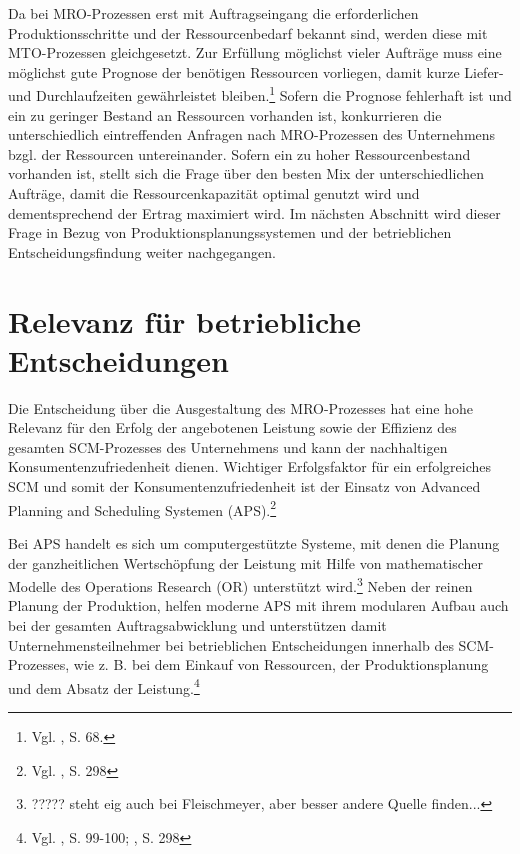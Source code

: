 Da bei MRO-Prozessen erst mit Auftragseingang die erforderlichen Produktionsschritte und der Ressourcenbedarf bekannt sind, werden diese mit MTO-Prozessen gleichgesetzt. Zur Erfüllung möglichst vieler Aufträge muss eine möglichst gute Prognose der benötigen Ressourcen vorliegen, damit kurze Liefer- und Durchlaufzeiten gewährleistet bleiben.\footnote{Vgl. \cite{thaler2001supply}, S. 68.} Sofern die Prognose fehlerhaft ist und ein zu geringer Bestand an Ressourcen vorhanden ist, konkurrieren die unterschiedlich eintreffenden Anfragen nach MRO-Prozessen des Unternehmens bzgl. der Ressourcen untereinander. Sofern ein zu hoher Ressourcenbestand vorhanden ist, stellt sich die Frage über den besten Mix der unterschiedlichen Aufträge, damit die Ressourcenkapazität optimal genutzt wird und dementsprechend der Ertrag maximiert wird. Im nächsten Abschnitt wird dieser Frage in Bezug von Produktionsplanungssystemen und der betrieblichen Entscheidungsfindung weiter nachgegangen.


\section{Relevanz für betriebliche Entscheidungen}

Die Entscheidung über die Ausgestaltung des MRO-Prozesses hat eine hohe Relevanz für den Erfolg der angebotenen Leistung sowie der Effizienz des gesamten SCM-Prozesses des Unternehmens und kann der nachhaltigen Konsumentenzufriedenheit dienen. Wichtiger Erfolgsfaktor für ein erfolgreiches SCM und somit der Konsumentenzufriedenheit ist der Einsatz von Advanced Planning and Scheduling Systemen (APS).\footnote{Vgl. \cite{fleischmeyr2004codp}, S. 298}

Bei APS handelt es sich um computergestützte Systeme, mit denen die Planung der ganzheitlichen Wertschöpfung der Leistung mit Hilfe von mathematischer Modelle des Operations Research (OR) unterstützt wird.\footnote{????? steht eig auch bei Fleischmeyer, aber besser andere Quelle finden...} Neben der reinen Planung der Produktion, helfen moderne APS mit ihrem modularen Aufbau auch bei der gesamten Auftragsabwicklung und unterstützen damit Unternehmensteilnehmer bei betrieblichen Entscheidungen innerhalb des SCM-Prozesses, wie z. B. bei dem Einkauf von Ressourcen, der Produktionsplanung und dem Absatz der Leistung.\footnote{Vgl. \cite{meyr2015structure}, S. 99-100; \cite{fleischmeyr2004codp}, S. 298}

